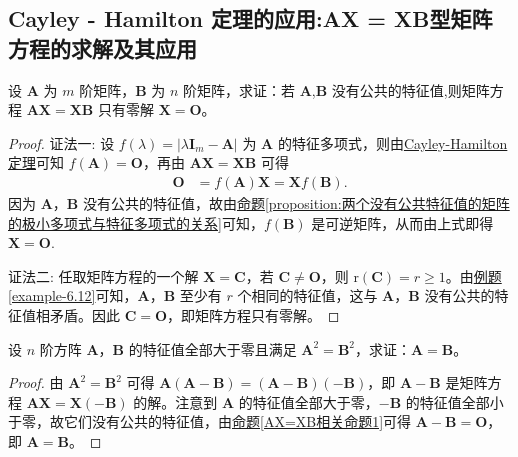 \documentclass[../../main.tex]{subfiles}
\begin{document}
\subsection{Cayley - Hamilton 定理的应用:AX = XB型矩阵方程的求解及其应用}

\begin{proposition}\label{AX=XB相关命题1}
设 \(\boldsymbol{A}\) 为 \(m\) 阶矩阵，\(\boldsymbol{B}\) 为 \(n\) 阶矩阵，求证：若 \(\boldsymbol{A}\),\(\boldsymbol{B}\) 没有公共的特征值,则矩阵方程 \(\boldsymbol{AX = XB}\) 只有零解 \(\boldsymbol{X = O}\)。 
\end{proposition}
\begin{proof}
{\color{blue}证法一:}
设 \(f(\lambda)=|\lambda\boldsymbol{I}_m - \boldsymbol{A}|\) 为 \(\boldsymbol{A}\) 的特征多项式，则由\hyperref[theorem:Cayley-Hamilton定理]{Cayley-Hamilton定理}可知 \(f(\boldsymbol{A})=\boldsymbol{O}\)，再由 \(\boldsymbol{AX = XB}\) 可得
\begin{align*}
\boldsymbol{O}&=f(\boldsymbol{A})\boldsymbol{X}=\boldsymbol{X}f(\boldsymbol{B}).
\end{align*}
因为 \(\boldsymbol{A}\)，\(\boldsymbol{B}\) 没有公共的特征值，故由\hyperref[proposition:两个没有公共特征值的矩阵的极小多项式与特征多项式的关系]{命题\ref{proposition:两个没有公共特征值的矩阵的极小多项式与特征多项式的关系}}可知，\(f(\boldsymbol{B})\) 是可逆矩阵，从而由上式即得 \(\boldsymbol{X = O}\).

{\color{blue}证法二:}
任取矩阵方程的一个解 \(\boldsymbol{X = C}\)，若 \(\boldsymbol{C\neq O}\)，则 \(\mathrm{r}(\boldsymbol{C}) = r\geq 1\)。由\hyperref[example-6.12]{例题\ref{example-6.12}}可知，\(\boldsymbol{A}\)，\(\boldsymbol{B}\) 至少有 \(r\) 个相同的特征值，这与 \(\boldsymbol{A}\)，\(\boldsymbol{B}\) 没有公共的特征值相矛盾。因此 \(\boldsymbol{C = O}\)，即矩阵方程只有零解。 
\end{proof}

\begin{example}\label{example:分块准对角阵的块之间两两没有公共特征值则与其可交换的矩阵也有同样分块}
设 \(n\) 阶方阵 \(\boldsymbol{A}\)，\(\boldsymbol{B}\) 的特征值全部大于零且满足 \(\boldsymbol{A}^2 = \boldsymbol{B}^2\)，求证：\(\boldsymbol{A} = \boldsymbol{B}\)。
\end{example}
\begin{proof}
由 \(\boldsymbol{A}^2 = \boldsymbol{B}^2\) 可得 \(\boldsymbol{A}(\boldsymbol{A - B}) = (\boldsymbol{A - B})(-\boldsymbol{B})\)，即 \(\boldsymbol{A - B}\) 是矩阵方程 \(\boldsymbol{AX = X(-B)}\) 的解。注意到 \(\boldsymbol{A}\) 的特征值全部大于零，\(-\boldsymbol{B}\) 的特征值全部小于零，故它们没有公共的特征值，由\hyperref[AX=XB相关命题1]{命题\ref{AX=XB相关命题1}}可得 \(\boldsymbol{A - B} = \boldsymbol{O}\)，即 \(\boldsymbol{A} = \boldsymbol{B}\)。
\end{proof}
\end{document}
